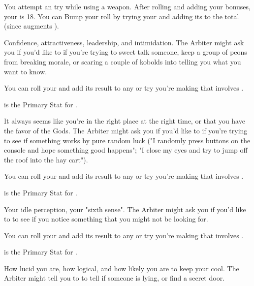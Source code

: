 \begin{multicols*}{2}
{    You attempt an  try while using a \VIG weapon. After rolling and adding your bonuses, your \SUMDICE is 18. You can Bump your roll by trying your \PRE \UD and adding its \SUMDICE to the total (since \PRE augments \VIG). 
}

\newpage


Confidence, attractiveness, leadership, and intimidation. The Arbiter might ask you if you'd like to \RSTRY{\PRE} if you're trying to sweet talk someone, keep a group of peons from breaking morale, or scaring a couple of kobolds into telling you what you want to know. 

You can roll your \PRE and add its result to any \RO or \RB try you're making that involves \VIG.  

\PRE is the Primary Stat for .



It always seems like you're in the right place at the right time, or that you have the favor of the Gods. The Arbiter might ask you if you'd like to \RSTRY{\TAL} if you're trying to see if something works by pure random luck ("I randomly press buttons on the console and hope something good happens"; "I close my eyes and try to jump off the roof into the hay cart").  

You can roll your \TAL and add its result to any \RO or \RB try you're making that involves \DEX.  

\TAL is the Primary Stat for .



Your idle perception, your "sixth sense". The Arbiter might ask you if you'd like to \RSTRY{\AWA} to see if you notice something that you might not be  looking for.

You can roll your \AWA and add its result to any \RO or \RB try you're making that involves \INT.  

\AWA is the Primary Stat for .



How lucid you are, how logical, and how likely you are to keep your cool.  The Arbiter might tell you to \RSTRY{\CLR} to tell if someone is lying, or find a secret door.


\end{multicols*}
